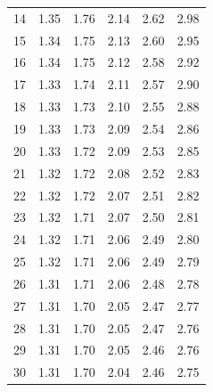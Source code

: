 \begin{center}
\begin{tabular}{r | rrr rr}
14  &  {\normalsize  1.35} & {\normalsize  1.76} & {\normalsize  2.14} & {\normalsize  2.62} & {\normalsize  2.98}  \\ 
15  &  {\normalsize  1.34} & {\normalsize  1.75} & {\normalsize  2.13} & {\normalsize  2.60} & {\normalsize  2.95}  \\ 
\hline
16  &  {\normalsize  1.34} & {\normalsize  1.75} & {\normalsize  2.12} & {\normalsize  2.58} & {\normalsize  2.92}  \\ 
17  &  {\normalsize  1.33} & {\normalsize  1.74} & {\normalsize  2.11} & {\normalsize  2.57} & {\normalsize  2.90}  \\ 
18  &  {\normalsize  1.33} & {\normalsize  1.73} & {\normalsize  2.10} & {\normalsize  2.55} & {\normalsize  2.88}  \\ 
19  &  {\normalsize  1.33} & {\normalsize  1.73} & {\normalsize  2.09} & {\normalsize  2.54} & {\normalsize  2.86}  \\ 
20  &  {\normalsize  1.33} & {\normalsize  1.72} & {\normalsize  2.09} & {\normalsize  2.53} & {\normalsize  2.85}  \\ 
\hline
\hline
21  &  {\normalsize  1.32} & {\normalsize  1.72} & {\normalsize  2.08} & {\normalsize  2.52} & {\normalsize  2.83}  \\ 
22  &  {\normalsize  1.32} & {\normalsize  1.72} & {\normalsize  2.07} & {\normalsize  2.51} & {\normalsize  2.82}  \\ 
23  &  {\normalsize  1.32} & {\normalsize  1.71} & {\normalsize  2.07} & {\normalsize  2.50} & {\normalsize  2.81}  \\ 
24  &  {\normalsize  1.32} & {\normalsize  1.71} & {\normalsize  2.06} & {\normalsize  2.49} & {\normalsize  2.80}  \\ 
25  &  {\normalsize  1.32} & {\normalsize  1.71} & {\normalsize  2.06} & {\normalsize  2.49} & {\normalsize  2.79}  \\ 
\hline
26  &  {\normalsize  1.31} & {\normalsize  1.71} & {\normalsize  2.06} & {\normalsize  2.48} & {\normalsize  2.78}  \\ 
27  &  {\normalsize  1.31} & {\normalsize  1.70} & {\normalsize  2.05} & {\normalsize  2.47} & {\normalsize  2.77}  \\ 
28  &  {\normalsize  1.31} & {\normalsize  1.70} & {\normalsize  2.05} & {\normalsize  2.47} & {\normalsize  2.76}  \\ 
29  &  {\normalsize  1.31} & {\normalsize  1.70} & {\normalsize  2.05} & {\normalsize  2.46} & {\normalsize  2.76}  \\ 
30  &  {\normalsize  1.31} & {\normalsize  1.70} & {\normalsize  2.04} & {\normalsize  2.46} & {\normalsize  2.75}  \\ 
\hline
\end{tabular}
\end{center}

